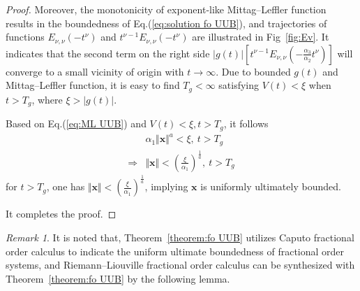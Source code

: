 \documentclass[ShortAfour]{sage}
\theoremstyle{plain}
\theoremstyle{remark}
\newtheorem{myrem}{Remark}
\begin{document}
\begin{proof}
Moreover, the monotonicity of exponent-like Mittag--Leffler function results in the boundedness of Eq.(\ref{eq:solution fo UUB}), and trajectories of functions $E_{\nu,\nu}\left(-t^\nu\right)$ and $t^{\nu-1}E_{\nu,\nu}\left(-t^\nu\right)$ are illustrated in Fig~\ref{fig:Ev}. It indicates that the second term on the right side $\vert g(t)\vert\left[t^{\nu-1}E_{\nu,\nu}\left(-\frac{\alpha_3}{\alpha_2}t^\nu\right)\right]$ will converge to a small vicinity of origin with $t\to\infty$. Due to bounded $g(t)$ and Mittag--Leffler function, it is easy to find $T_g<\infty$ satisfying $V(t)<\xi$ when $t>T_g$, where $\xi>\vert g(t)\vert$.

Based on Eq.(\ref{eq:ML UUB}) and $V(t)<\xi,t>T_g$, it follows
\begin{align*}
  &\alpha_1\Vert\bm x\Vert^a< \xi,\ t>T_g\\
  \Rightarrow&\Vert\bm x\Vert<\left(\frac{\xi}{\alpha_1}\right)^\frac{1}{a},\ t>T_g
\end{align*}
for $t>T_g$, one has $\Vert\bm x\Vert<\left(\frac{\xi}{\alpha_1}\right)^\frac{1}{a}$, implying $\bm x$ is uniformly ultimately bounded. 

It completes the proof.
\end{proof}


\begin{myrem}
  It is noted that, Theorem~\ref{theorem:fo UUB} utilizes Caputo fractional order calculus to indicate the uniform ultimate boundedness of fractional order systems, and Riemann--Liouville fractional order calculus can be synthesized with Theorem~\ref{theorem:fo UUB} by the following lemma.
\end{myrem}
\end{document}
